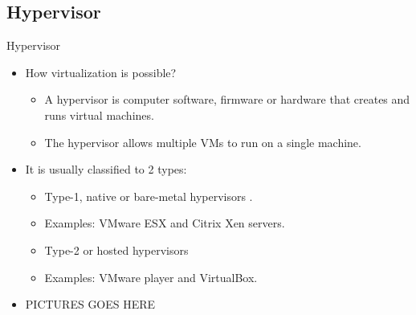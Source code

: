 \subsection{Hypervisor}\label{subsec:hypervisor}
\begin{frame}{Hypervisor}
    \begin{itemize}
        \item How virtualization is possible?
        \begin{itemize}
            \item A hypervisor is computer software, firmware or hardware that creates and runs virtual machines.
            \item The hypervisor allows multiple VMs to run on a single machine.
        \end{itemize}
        \item It is usually classified to 2 types:
        \begin{itemize}
            \item Type-1, native or bare-metal hypervisors .
            \item Examples: VMware ESX and Citrix Xen servers.
            \item Type-2 or hosted hypervisors
            \item Examples: VMware player and VirtualBox.
        \end{itemize}
        \item PICTURES GOES HERE
    \end{itemize}
\end{frame}
